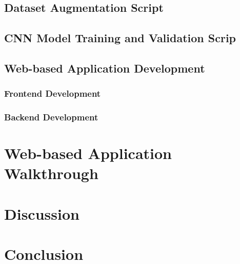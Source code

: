 \documentclass{BachelorBUI}
\begin{document}
    \subsection{Dataset Augmentation Script}
    \subsection{CNN Model Training and Validation Scrip}
    \subsection{Web-based Application Development}
        \subsubsection{Frontend Development}
        \subsubsection{Backend Development}

\section{Web-based Application Walkthrough}

\section{Discussion}

\section{Conclusion}

\clearpage
\printbibliography
\end{document}
